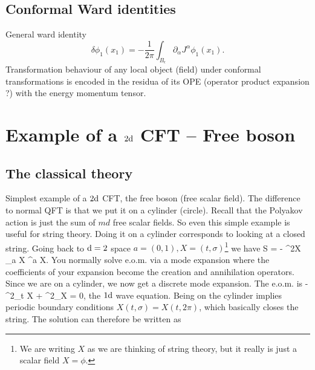  	
 	
 	 	
 	\subsection{Conformal Ward identities}
 	\begin{mybox}{}
 		General ward identity
 		\begin{equation}
 		\delta \phi_1 (x_1) = - \frac{1}{2 \pi} \int_{B_\epsilon} \partial_\alpha J^\alpha \phi_1(x_1).
 		\end{equation}
 		Transformation behaviour of any local object (field) under conformal transformations is encoded in the residua of its OPE (operator product expansion ?) with the energy momentum tensor.
 	\end{mybox}
 	
 	
 	
 	
 	
 	
 	

 	\section{Example of a $2\mathrm{d}$ CFT -- Free boson}
 	\subsection{The classical theory}
 	Simplest example of a $2\mathrm{d}$ CFT, the free boson (free scalar field). The difference to normal QFT is that we put it on a cylinder (circle). Recall that the Polyakov action is just the sum of $md$ free scalar fields. So even this simple example is useful for string theory. Doing it on a cylinder corresponds to looking at a closed string. Going back to $\mathrm{d}=2$ space $a=(0,1), X=(t,\sigma)$\footnote{We are writing $X$ as we are thinking of string theory, but it really is just a scalar field $X=\phi$.} we have
 \be
 S = - \int \md^2X \partial_a X \partial^a X.
 \ee 
 You normally solve e.o.m. via a mode expansion where the coefficients of your expansion become the creation and annihilation operators. Since we are on a cylinder, we now get a discrete mode expansion. The e.o.m. is
 \be 
 - \partial^2_t X + \partial^2_\sigma X = 0,
 \ee 
 the $1 \mathrm{d}$ wave equation. Being on the cylinder implies periodic boundary conditions $X(t,\sigma) =X(t,2 \pi)$, which basically closes the string. The solution can therefore be written as
 
